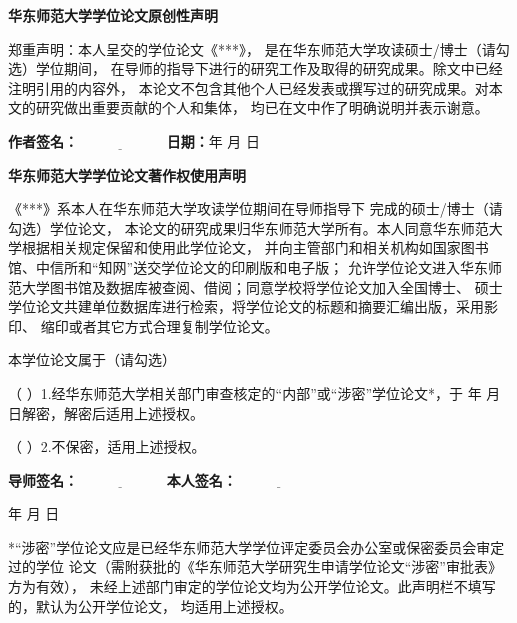 \newpage

\pagestyle{empty} 

{\leading{17pt}

\begin{center}
{\bf\songti\xiaosihao
华东师范大学学位论文原创性声明}
\end{center}

\vspace{0.5cm}

{\songti{}
\indent
郑重声明：本人呈交的学位论文《***》，
是在华东师范大学攻读硕士/博士（请勾选）学位期间，
在导师的指导下进行的研究工作及取得的研究成果。除文中已经注明引用的内容外，
本论文不包含其他个人已经发表或撰写过的研究成果。对本文的研究做出重要贡献的个人和集体，
均已在文中作了明确说明并表示谢意。

\vspace{0.5cm}

{\bf 作者签名：}$\underline{\qquad\qquad\qquad }$ 
\qquad\qquad\qquad\qquad\qquad\qquad\qquad
{\bf 日期：}\quad\qquad 年 \quad 月 \quad 日
}

\vskip 1.8cm

\begin{center}
{\bf\songti\xiaosihao
华东师范大学学位论文著作权使用声明}
\end{center}

\vspace{.5cm}

{\songti{}
\indent
《***》系本人在华东师范大学攻读学位期间在导师指导下
完成的硕士/博士（请勾选）学位论文，
本论文的研究成果归华东师范大学所有。本人同意华东师范大学根据相关规定保留和使用此学位论文，
并向主管部门和相关机构如国家图书馆、中信所和“知网”送交学位论文的印刷版和电子版；
允许学位论文进入华东师范大学图书馆及数据库被查阅、借阅；同意学校将学位论文加入全国博士、
硕士学位论文共建单位数据库进行检索，将学位论文的标题和摘要汇编出版，采用影印、
缩印或者其它方式合理复制学位论文。

本学位论文属于（请勾选）

（
）1.经华东师范大学相关部门审查核定的“内部”或“涉密”学位论文*，于  \quad
年 \quad 月 \quad 日解密，解密后适用上述授权。

（ ）2.不保密，适用上述授权。

\vspace{0.5cm}

{\bf 导师签名：}$\underline{\qquad\qquad\qquad }$
\qquad\qquad\qquad\qquad\qquad\qquad\qquad  
{\bf 本人签名：}$\underline{\qquad\qquad\qquad
}$

\vspace{0.5cm}

\hspace*{11cm} 年 \quad 月 \quad 日
}


\vspace{1.5cm}


}

\begin{spacing}{1.15}
\setlength{\hangindent}{2em}
{ *“涉密”学位论文应是已经华东师范大学学位评定委员会办公室或保密委员会审定过的学位
论文（需附获批的《华东师范大学研究生申请学位论文“涉密”审批表》方为有效），
未经上述部门审定的学位论文均为公开学位论文。此声明栏不填写的，默认为公开学位论文，
均适用上述授权。}
\end{spacing}
